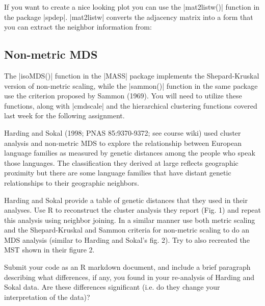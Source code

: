 If you want to create a nice looking plot you can use the  |mat2listw()| function in the package |spdep|. |mat2listw|  converts the adjacency matrix into a form that you can extract the neighbor information from:
%



\subsection{Non-metric MDS}

The |isoMDS()| function in the |MASS| package implements the Shepard-Kruskal version of non-metric scaling, while the |sammon()| function in the same package use the criterion proposed by Sammon (1969). You will need to utilize these functions, along with |cmdscale| and the hierarchical clustering functions covered last week for the following assignment.

\medskip
\begin{assignment}
Harding and Sokal (1998; PNAS 85:9370-9372; see course wiki) used cluster analysis and non-metric MDS to explore the relationship between European language families as measured by genetic distances among the people who speak those languages.  The classification they derived at large reflects geographic proximity but there are some language families that have distant genetic relationships to their geographic neighbors.

\medskip
Harding and Sokal provide a table of genetic distances that they used in their analyses. Use R to reconstruct the cluster analysis they report (Fig. 1) and repeat this analysis using neighbor joining. In a similar manner use both metric scaling and the Shepard-Kruskal and Sammon criteria for non-metric scaling to do an MDS analysis (similar to Harding and Sokal's fig. 2).  Try to also recreated the MST shown in their figure 2.

\medskip
Submit your code as an R markdown document, and include a brief paragraph describing what differences, if any, you found in your re-analysis of Harding and Sokal data. Are these differences significant (i.e. do they change your interpretation of the data)?

\end{assignment}



